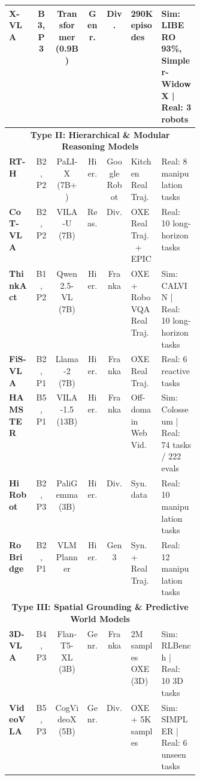 \documentclass[acmsmall,screen,review]{acmart}
\begin{document}
\begin{table}[t!]
\begin{tabular}{
  l
  c
  c
  c
  c
  p{0.168\linewidth}
  p{0.205\linewidth}
}
\textbf{X-VLA}~\cite{zheng2026xvla} & B3, P3 & Transformer (0.9B) & Genr. & Div. & 290K episodes & Sim: LIBERO 93\%, Simpler-WidowX | Real: 3 robots \\

\midrule

\multicolumn{7}{c}{\textbf{Type II\@: Hierarchical \& Modular Reasoning Models}} \\
\midrule

\textbf{RT-H}~\cite{belkhale2024rth} & B2, P2 & PaLI-X (7B+) & Hier. & Google Robot & Kitchen Real Traj. & Real: 8 manipulation tasks \\

\textbf{CoT-VLA}~\cite{zhao2025cotvla} & B2, P2 & VILA-U (7B) & Reas. & Div. & OXE Real Traj.\ + EPIC & Real: 10 long-horizon tasks \\

\textbf{ThinkAct}~\cite{huang2025thinkact} & B1, P2 & Qwen2.5-VL (7B) & Hier. & Franka & OXE + RoboVQA Real Traj. & Sim: CALVIN | Real: 10 long-horizon tasks \\

\textbf{FiS-VLA}~\cite{chen2025fis} & B2, P1 & Llama-2 (7B) & Hier. & Franka & OXE Real Traj. & Real: 6 reactive tasks \\

\textbf{HAMSTER}~\cite{li2025hamster} & B5, P1 & VILA-1.5 (13B) & Hier. & Franka & Off-domain Web Vid. & Sim: Colosseum | Real: 74 tasks / 222 evals \\

\textbf{Hi Robot}~\cite{shi2025hirobot} & B2, P3 & PaliGemma (3B) & Hier. & Div. & Syn.\ data & Real: 10 manipulation tasks \\

\textbf{RoBridge}~\cite{zhang2025robridge} & B2, P1 & VLM Planner & Hier. & Gen3 & Syn.\ + Real Traj. & Real: 12 manipulation tasks \\

\midrule

\multicolumn{7}{c}{\textbf{Type III\@: Spatial Grounding \& Predictive World Models}} \\
\midrule

\textbf{3D-VLA}~\cite{zhen20243dvla} & B4, P3 & Flan-T5-XL (3B) & Genr. & Franka & 2M samples OXE (3D) & Sim: RLBench | Real: 10 3D tasks \\

\textbf{VideoVLA}~\cite{shen2025videovla} & B5, P3 & CogVideoX (5B) & Genr. & Div. & OXE + 5K samples & Sim: SIMPLER | Real: 6 unseen tasks \\


\end{tabular}
\end{table}
\end{document}
